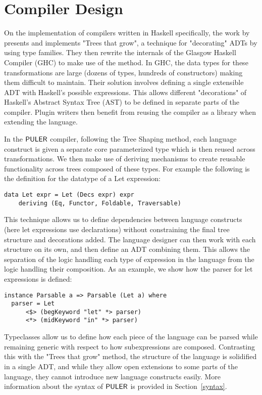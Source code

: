 \chapter{Compiler Design}
\label{compiler}
\thispagestyle{myheadings}


On the implementation of compilers written in Haskell specifically, the work by \citet{najd2017trees} presents and implements "Trees that grow", a technique for "decorating" ADTs by using type families.
They then rewrite the internals of the Glasgow Haskell Compiler (GHC) \cite{GHC} to make use of the method.
In GHC, the data types for these transformations are large (dozens of types, hundreds of constructors) making them difficult to maintain.
Their solution involves defining a single extensible ADT with Haskell's possible expressions.
This allows different "decorations" of Haskell's Abstract Syntax Tree (AST) to be defined in separate parts of the compiler.
Plugin writers then benefit from reusing the compiler as a library when extending the language.

In the $\mathsf{PULER}$ compiler, following the Tree Shaping method, each language construct is given a separate core parameterized type which is then reused across transformations.
We then make use of deriving mechanisms to create reusable functionality across trees composed of these types.
For example the following is the definition for the datatype of a Let expression:
\begin{verbatim}
data Let expr = Let (Decs expr) expr
    deriving (Eq, Functor, Foldable, Traversable)
\end{verbatim}
This technique allows us to define dependencies between language constructs (here let expressions use declarations) without constraining the final tree structure and decorations added.
The language designer can then work with each structure on its own, and then define an ADT combining them.
This allows the separation of the logic handling each type of expression in the language from the logic handling their composition.
As an example, we show how the parser for let expressions is defined:
\begin{verbatim}
instance Parsable a => Parsable (Let a) where
  parser = Let
      <$> (begKeyword "let" *> parser)
      <*> (midKeyword "in" *> parser)
\end{verbatim}
Typeclasses allow us to define how each piece of the language can be parsed while remaining generic with respect to how subexpressions are composed.
Contrasting this with the "Trees that grow" method, the structure of the language is solidified in a single ADT, and while they allow open extensions to some parts of the language, they cannot introduce new language constructs easily.
More information about the syntax of $\mathsf{PULER}$ is provided in Section~\ref{syntax}.

